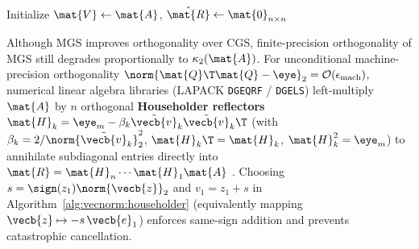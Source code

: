 \documentclass[../../../../master.tex]{subfiles}
\begin{document}
\begin{algorithm}[htbp]
\caption{Modified Gram--Schmidt (MGS) Economy QR Factorization}
\label{alg:vecnorm:mgs}
Initialize $\mat{V} \leftarrow \mat{A}$, $\hat{\mat{R}} \leftarrow \mat{0}_{n \times n}$\;
\;
\end{algorithm}

Although MGS improves orthogonality over CGS, finite-precision orthogonality of MGS still degrades proportionally to $\kappa_2(\mat{A})$. For unconditional machine-precision orthogonality $\norm{\mat{Q}\T\mat{Q} - \eye}_2 = \mathcal{O}(\epsilon_{\mathrm{mach}})$, numerical linear algebra libraries (LAPACK \texttt{DGEQRF} / \texttt{DGELS}) left-multiply $\mat{A}$ by $n$ orthogonal \textbf{Householder reflectors} $\mat{H}_k = \eye_m - \beta_k \tilde{\vecb{v}}_k \tilde{\vecb{v}}_k\T$ (with $\beta_k = 2/\norm{\tilde{\vecb{v}}_k}_2^2$, $\mat{H}_k\T = \mat{H}_k$, $\mat{H}_k^2 = \eye_m$) to annihilate subdiagonal entries directly into $\mat{R} = \mat{H}_n \cdots \mat{H}_1 \mat{A}$ . Choosing $s = \sign(z_1)\norm{\vecb{z}}_2$ and $v_1 = z_1 + s$ in Algorithm~\ref{alg:vecnorm:householder} (equivalently mapping $\vecb{z} \mapsto -s\,\vecb{e}_1$) enforces same-sign addition and prevents catastrophic cancellation.
\end{document}
